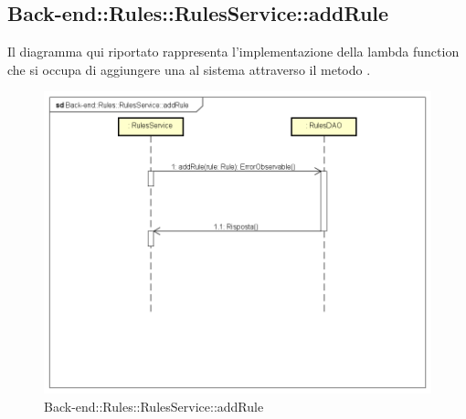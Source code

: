 \subsection{Back-end::Rules::RulesService::addRule}
Il diagramma qui riportato rappresenta l'implementazione della lambda function che si occupa di aggiungere una  al sistema attraverso il metodo . 
 \begin{figure}[h] \centering \includegraphics[width=\textwidth,height=\textheight,keepaspectratio]{images/diagrams/back-end/Ufficial_Backend/Back-endRulesRulesServiceaddRule.png} 	\caption{Back-end::Rules::RulesService::addRule}
\end{figure} 
\newpage



